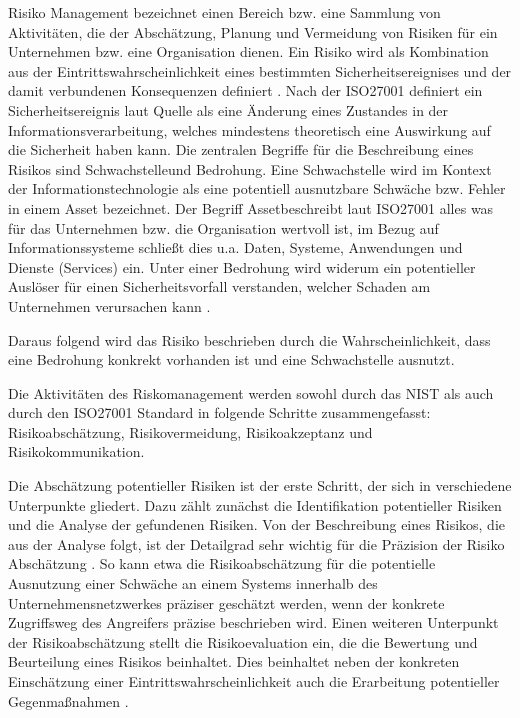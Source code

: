 Risiko Management bezeichnet einen Bereich bzw. eine Sammlung von Aktivitäten, die der Abschätzung, Planung und Vermeidung von Risiken für ein Unternehmen bzw. eine Organisation dienen. Ein Risiko wird als Kombination aus der Eintrittswahrscheinlichkeit eines bestimmten Sicherheitsereignises und der damit verbundenen Konsequenzen definiert \citep{Partida2010}. Nach der ISO27001 
definiert ein Sicherheitsereignis laut Quelle \citep{RM2} als eine Änderung eines Zustandes in der Informationsverarbeitung, welches mindestens theoretisch eine Auswirkung auf die Sicherheit haben kann. 
Die zentralen Begriffe für die Beschreibung eines Risikos sind \glqq Schwachstelle\grqq     und \glqq Bedrohung\grqq . Eine Schwachstelle wird im Kontext der Informationstechnologie als eine potentiell ausnutzbare Schwäche bzw. Fehler in einem Asset bezeichnet. Der Begriff \glqq Asset\grqq  beschreibt laut ISO27001 alles was für das Unternehmen bzw. die Organisation wertvoll ist, im Bezug auf Informationssysteme schließt dies u.a. Daten, Systeme, Anwendungen und Dienste (Services) ein. Unter einer Bedrohung wird widerum ein potentieller Auslöser für einen Sicherheitsvorfall verstanden, welcher Schaden am Unternehmen verursachen kann \citep{RM2}.

Daraus folgend wird das Risiko beschrieben durch die Wahrscheinlichkeit, dass eine Bedrohung konkrekt vorhanden ist und eine Schwachstelle ausnutzt.


Die Aktivitäten des Riskomanagement werden sowohl durch das NIST als auch durch den ISO27001 Standard in folgende Schritte zusammengefasst: Risikoabschätzung, Risikovermeidung, Risikoakzeptanz und Risikokommunikation.

Die Abschätzung potentieller Risiken ist der erste Schritt, der sich in verschiedene Unterpunkte gliedert. Dazu zählt zunächst die Identifikation potentieller Risiken und die Analyse der gefundenen Risiken. Von der Beschreibung eines Risikos, die aus der Analyse folgt, ist der Detailgrad sehr wichtig für die Präzision der Risiko Abschätzung \citep{RM2}. %
So kann etwa die Risikoabschätzung für die potentielle Ausnutzung einer Schwäche an einem Systems innerhalb des Unternehmensnetzwerkes präziser geschätzt werden, wenn der konkrete Zugriffsweg des Angreifers präzise beschrieben wird. Einen weiteren Unterpunkt der Risikoabschätzung stellt die Risikoevaluation ein, die die Bewertung und Beurteilung eines Risikos beinhaltet. Dies beinhaltet neben der konkreten Einschätzung einer Eintrittswahrscheinlichkeit auch die Erarbeitung potentieller Gegenmaßnahmen \citep{Partida2010}.

